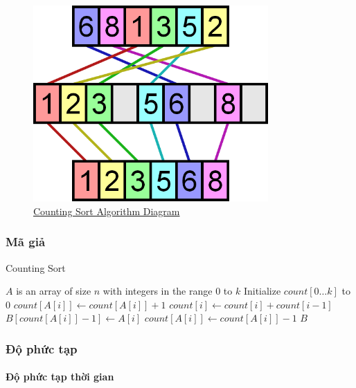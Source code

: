 \begin{figure}[H]
    \centering
    \includegraphics[width=0.8\textwidth]{img/counting-sort.png}
    \caption{\href{https://www.growingwiththeweb.com/images/2014/05/25/counting-sort.svg}{Counting Sort Algorithm Diagram}}
\end{figure}

\subsubsection{Mã giả}
 
\begin{algorithm}[H]
\caption{Counting Sort}
\label{alg:counting-sort}
\begin{algorithmic}

\Require $A$ is an array of size $n$ with integers in the range $0$ to $k$
\State Initialize $count[0 \dots k]$ to $0$
    \State $count[A[i]] \gets count[A[i]] + 1$
\EndFor
{}
    \State $count[i] \gets count[i] + count[i-1]$
\EndFor
{}
    \State $B[count[A[i]]-1] \gets A[i]$
    \State $count[A[i]] \gets count[A[i]] - 1$
\EndFor
\State \Return $B$
\EndFunction

\end{algorithmic}
\end{algorithm}


\subsubsection{Độ phức tạp}
\paragraph{Độ phức tạp thời gian}


